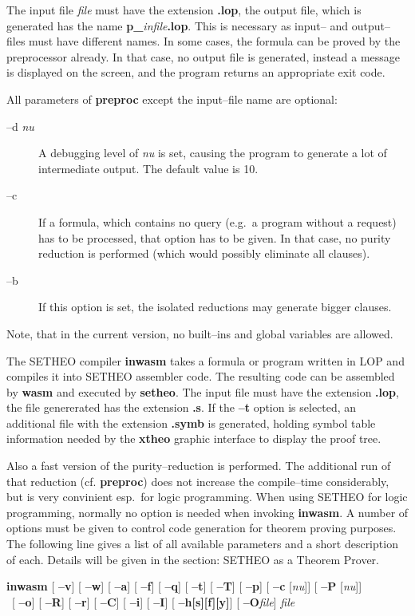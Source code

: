 The input file {\it file\/} must have the extension {\bf .lop}, the output file,
which is generated has the name {\bf p\_}{\it infile}{\bf .lop}.
This is necessary as input-- and output--files must have different
names.
In some cases, the formula can be proved by the preprocessor already.
In that case, no output file is generated, instead a message is displayed
on the screen, and the program returns an appropriate exit code.

All parameters of {\bf preproc} except the input--file name are optional:
\begin{description}
\item[--d {\it nu}]
A debugging level of {\it nu\/} is set, causing the program to generate
a lot of intermediate output. The default value is 10.
\item[--c]
If a formula, which contains no query (e.g.\ a program without a request)
has to be processed, that option has to be given. In that case, no
purity reduction is performed (which would possibly eliminate all clauses).
\item[--b]
If this option is set, the isolated reductions may generate bigger clauses.
\end{description}

Note, that in the current version, no built--ins and global variables are
allowed.


The SETHEO compiler {\bf inwasm} takes a formula or program
written in LOP and compiles it into SETHEO assembler code. 
The resulting 
code can be assembled by {\bf wasm} and executed by {\bf setheo}.
The input file must have the extension {\bf .lop\/}, the file genererated
has the extension {\bf .s\/}.
If the {\bf --t} option is selected, an additional file with the extension
{\bf .symb} is generated, holding symbol table information needed by the
{\bf xtheo} graphic interface to display the proof tree.

Also a fast version of the purity--reduction is performed.
The additional run of that reduction (cf. {\bf preproc}) does not increase
the compile--time considerably, but is very convinient esp.\ for logic
programming.
When using SETHEO for logic programming, normally no option is needed
when invoking {\bf inwasm}.
A number of options must be given to control code generation for theorem
proving purposes.
The following line gives a list of all available parameters and a short
description of each. Details will be given in the section: SETHEO as a
Theorem Prover.

\begin{center}
{\bf inwasm}
[ {\bf --v}]
[ {\bf --w}]
[ {\bf --a}]
[ {\bf --f}]
[ {\bf --q}]
[ {\bf --t}]
[ {\bf --T}]
[ {\bf --p}]
[ {\bf --c} [{\it nu\/}]] 
[ {\bf --P} [{\it nu\/}]] \\ \,
[ {\bf --o}]
[ {\bf --R}]
[ {\bf --r}]
[ {\bf --C}]
[ {\bf --i}]
[ {\bf --I}]
[ {\bf --h{\bf [}s{\bf ][}f{\bf ][}y{\bf ]}}]
[ {\bf --O}{\it file\/}]
{\it file\/}
\end{center}

